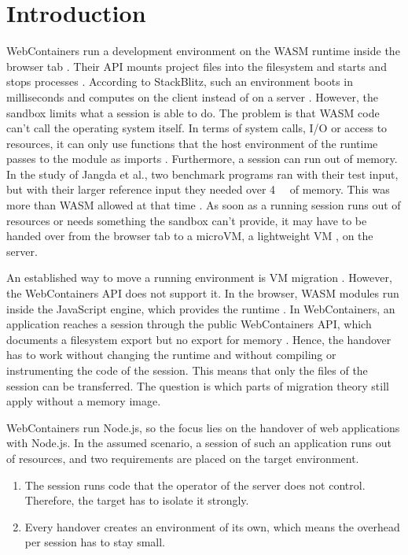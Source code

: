 \section{Introduction}
\label{sec:introduction}

WebContainers run a development environment on the \ac{WASM} runtime inside the browser tab \cite{stackblitz-blog-2021,stackblitz-intro}. Their \ac{API} mounts project files into the filesystem and starts and stops processes \cite{stackblitz-quickstart,stackblitz-2024}. According to StackBlitz, such an environment boots in milliseconds and computes on the client instead of on a server \cite{stackblitz-blog-2021,stackblitz-intro}. However, the sandbox limits what a session is able to do. The problem is that \ac{WASM} code can't call the operating system itself. In terms of system calls, I/O or access to resources, it can only use functions that the host environment of the runtime passes to the module as imports \cite{w3c-wasm-2026}. Furthermore, a session can run out of memory. In the study of Jangda et al., two benchmark programs ran with their test input, but with their larger reference input they needed over \SI{4}{\giga\byte} of memory. This was more than \ac{WASM} allowed at that time \cite{jangda2019not}. As soon as a running session runs out of resources or needs something the sandbox can't provide, it may have to be handed over from the browser tab to a microVM, a lightweight \ac{VM} \cite{agache2020firecracker,xiao2023attacks}, on the server.

An established way to move a running environment is \ac{VM} migration \cite{clark2005live}. However, the WebContainers \ac{API} does not support it. In the browser, \ac{WASM} modules run inside the JavaScript engine, which provides the runtime \cite{zhang2025research}. In WebContainers, an application reaches a session through the public WebContainers \ac{API}, which documents a filesystem export but no export for memory \cite{stackblitz-2024}. Hence, the handover has to work without changing the runtime and without compiling or instrumenting the code of the session. This means that only the files of the session can be transferred. The question is which parts of migration theory still apply without a memory image.

WebContainers run Node.js, so the focus lies on the handover of web applications with Node.js. In the assumed scenario, a session of such an application runs out of resources, and two requirements are placed on the target environment. 
\begin{enumerate}
\item The session runs code that the operator of the server does not control. Therefore, the target has to isolate it strongly.
\item Every handover creates an environment of its own, which means the overhead per session has to stay small.
\end{enumerate}

